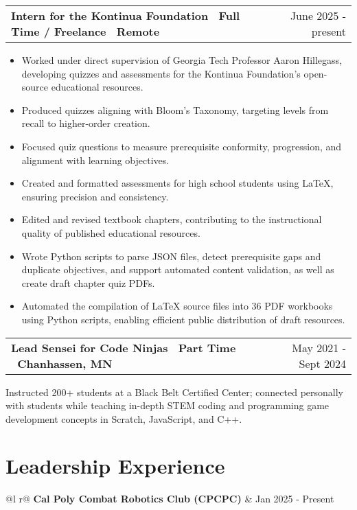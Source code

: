 \documentclass[a4paper,12pt]{article}
\makeatletter
\newenvironment{jobshort}[2]
    {
    \begin{tabularx}{\linewidth}{@{}l X r@{}}
    \textbf{#1} & \hfill &  #2 \\[3.75pt]
    \end{tabularx}
    }
    {
    }
\newenvironment{joblong}[2]
    {
    \begin{tabularx}{\linewidth}{@{}l X r@{}}
    \textbf{#1} & \hfill &  #2 \\[3.75pt]
    \end{tabularx}
    \begin{minipage}[t]{\linewidth}
    \begin{itemize}[nosep,after=\strut, leftmargin=1em, itemsep=3pt,label=--]
    }
    {
    \end{itemize}
    \end{minipage}    
    }
\makeatother
\begin{document}
\begin{joblong}{Intern for the Kontinua Foundation \textbullet\ Full Time / Freelance \textbullet\ Remote}{June 2025 - present}
\item Worked under direct supervision of Georgia Tech Professor Aaron Hillegass, developing quizzes and assessments for the Kontinua Foundation's open-source educational resources.
\item Produced quizzes aligning with Bloom's Taxonomy, targeting levels from recall to higher-order creation.
\item Focused quiz questions to measure prerequisite conformity, progression, and alignment with learning objectives.
\item Created and formatted assessments for high school students using LaTeX, ensuring precision and consistency.
\item Edited and revised textbook chapters, contributing to the instructional quality of published educational resources.
\item Wrote Python scripts to parse JSON files, detect prerequisite gaps and duplicate objectives, and support automated content validation, as well as create draft chapter quiz PDFs.
\item Automated the compilation of LaTeX source files into 36 PDF workbooks using Python scripts, enabling efficient public distribution of draft resources.
\end{joblong}


\begin{jobshort}{Lead Sensei for Code Ninjas \textbullet\ Part Time \textbullet\ Chanhassen, MN}{May 2021 - Sept 2024}
Instructed 200+ students at a Black Belt Certified Center; connected personally with students while teaching in-depth STEM coding and programming game development concepts in Scratch, JavaScript, and C++.
\end{jobshort}
\section{Leadership Experience}

\begin{tabularx}{\linewidth}{ @{}l r@{} }
\textbf{Cal Poly Combat Robotics Club (CPCPC)} & \hfill Jan 2025 - Present \\[3.75pt]
   \\
\end{tabularx}
\end{document}
